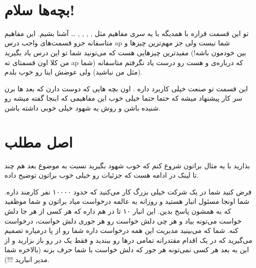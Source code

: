 \documentclass[]{article}
\begin{document}
\newpage
\pagestyle{fancy}
\fancyhf{}
\fancyfoot{}
\cfoot{\thepage}
\renewcommand{\headrulewidth}{2pt}

\KashidaOff


 \Large \textbf{\\
}


\section*{{\titr بچه‌ها سلام!}}

تو این قسمت قراره با همدیگه با یه سری مفاهیم مثل ,  ,  ,  , … آشنا بشیم. این مفاهیم متاسفانه جزو قسمت‌های واجب درس ap شما نیست ولی جز مهم‌ترین چیز‌ها و مفیدترین چیزهایی هست که می‌تونید شما تو این درس یاد بگیرید (بین خودمون باشه! من کلا اون قسمتای ته ap که درباره‌ی  و  هست رو درست یاد نگرفتم متاسفانه (شما مثل من نباشید) ولی عوضش اینا رو خوب بلدم).
 
این قسمت تو صنعت خیلی کاربرد داره . اون بچه هایی که دوست دارن که بعد ها برن سر کار پیشنهاد میشه که حتما حتما خیلی خوب  این مفاهیمی که اینجا گفته میشه رو شنیده باشن و روش یه شهود خیلی خوبی داشته باشن.

\section*{{\titr اصل مطلب}}

بذارید با یه مثال براتون شروع کنم که خوب شهود بگیرید نسبت به موضوع بعد هم چند تا لینک در ادامه هست که جزئیات رو خیلی خوب براتون توضیح داده.

فرض کنید شما در یک شرکت خیلی بزرگ کار می‌کنید که حدود ۱۰۰۰۰ نفر کارمند داره. شما اونجا مسئول انبار هستید و روزانه یه عالمه درخواست میاد براتون و شما موظفید که به همشون پاسخ بدین. این انبار ۱۰ تا در هم داره که هر کسی از هر جا دلش خواست می‌تونه بیاد و هر چی دلش خواست رو هر جوری دلش خواست، درخواست کنه. شما که می‌بینید مدیریت این همه درخواست داره شما رو از پا درمیاره تصمیم می‌گیرید که در یک اقدام مقتدرانه تمامی درها رو ببندید و فقط یک در رو باز بزارید و از این به بعد هر کسی نمی‌تونه هر جور که دلش خواست با شما حرف بزنه (بالاخره شما مدیر انبارید !!!).
\end{document}
